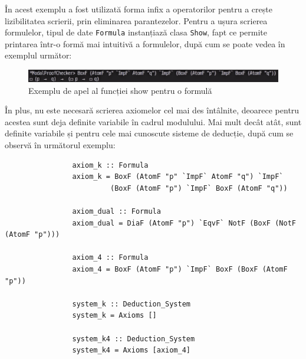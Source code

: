 \documentclass[12pt, openany]{book}
\begin{document}
            \par{}
                În acest exemplu a fost utilizată forma infix a operatorilor pentru a crește lizibilitatea scrierii, 
                prin eliminarea parantezelor. Pentru a ușura scrierea formulelor, tipul de date \texttt{Formula} 
                instanțiază clasa \texttt{Show}, fapt ce permite printarea într-o formă mai intuitivă a formulelor, după 
                cum se poate vedea în exemplul următor:
            
            \begin{figure}[h!]
            \label{fig_show_formula}
                \includegraphics[width=\linewidth]{images/show_formula.png}
                \centering
                \caption{Exemplu de apel al funcției show pentru o formulă}
            \end{figure}

            \par{}
                În plus, nu este necesară scrierea axiomelor cel mai des întâlnite, deoarece pentru acestea sunt deja 
                definite variabile în cadrul modulului. Mai mult decât atât, sunt definite variabile și pentru cele 
                mai cunoscute sisteme de deducție, după cum se observă în următorul exemplu:

            \begin{lstlisting}
                axiom_k :: Formula
                axiom_k = BoxF (AtomF "p" `ImpF` AtomF "q") `ImpF` 
                         (BoxF (AtomF "p") `ImpF` BoxF (AtomF "q"))

                axiom_dual :: Formula
                axiom_dual = DiaF (AtomF "p") `EqvF` NotF (BoxF (NotF (AtomF "p")))

                axiom_4 :: Formula
                axiom_4 = BoxF (AtomF "p") `ImpF` BoxF (BoxF (AtomF "p"))
                
                system_k :: Deduction_System
                system_k = Axioms []

                system_k4 :: Deduction_System
                system_k4 = Axioms [axiom_4]
            \end{lstlisting}
\end{document}
